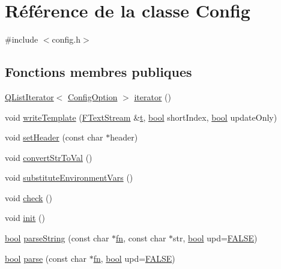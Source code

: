 \hypertarget{class_config}{}\section{Référence de la classe Config}
\label{class_config}


{\ttfamily \#include $<$config.\+h$>$}

\subsection*{Fonctions membres publiques}
\begin{DoxyCompactItemize}
\item 
\hyperlink{class_q_list_iterator}{Q\+List\+Iterator}$<$ \hyperlink{class_config_option}{Config\+Option} $>$ \hyperlink{class_config_a59615f7624930345909a761a2b965368}{iterator} ()
\item 
void \hyperlink{class_config_ae9e299c7239061edc8c369f51d3948e6}{write\+Template} (\hyperlink{class_f_text_stream}{F\+Text\+Stream} \&\hyperlink{058__bracket__recursion_8tcl_a69e959f6901827e4d8271aeaa5fba0fc}{t}, \hyperlink{qglobal_8h_a1062901a7428fdd9c7f180f5e01ea056}{bool} short\+Index, \hyperlink{qglobal_8h_a1062901a7428fdd9c7f180f5e01ea056}{bool} update\+Only)
\item 
void \hyperlink{class_config_a35289b038e63c7943cc09080e6ac3a7b}{set\+Header} (const char $\ast$header)
\item 
void \hyperlink{class_config_a0be224084aa38a9d479ed0260baf27a6}{convert\+Str\+To\+Val} ()
\item 
void \hyperlink{class_config_a6b714f42522fe1359a3ae30fef026d9b}{substitute\+Environment\+Vars} ()
\item 
void \hyperlink{class_config_a2d04091f571813bab7171cf713917aff}{check} ()
\item 
void \hyperlink{class_config_a91bcb187ed95ec673137e413a4d77203}{init} ()
\item 
\hyperlink{qglobal_8h_a1062901a7428fdd9c7f180f5e01ea056}{bool} \hyperlink{class_config_ac8073ed6db862661580c2326f99e9681}{parse\+String} (const char $\ast$\hyperlink{tclscanner_8cpp_a9ffad97216456d27984aacce395adf85}{fn}, const char $\ast$str, \hyperlink{qglobal_8h_a1062901a7428fdd9c7f180f5e01ea056}{bool} upd=\hyperlink{qglobal_8h_a10e004b6916e78ff4ea8379be80b80cc}{F\+A\+L\+S\+E})
\item 
\hyperlink{qglobal_8h_a1062901a7428fdd9c7f180f5e01ea056}{bool} \hyperlink{class_config_afae87daee21980667125bc085eee3c36}{parse} (const char $\ast$\hyperlink{tclscanner_8cpp_a9ffad97216456d27984aacce395adf85}{fn}, \hyperlink{qglobal_8h_a1062901a7428fdd9c7f180f5e01ea056}{bool} upd=\hyperlink{qglobal_8h_a10e004b6916e78ff4ea8379be80b80cc}{F\+A\+L\+S\+E})

\end{DoxyCompactItemize}
